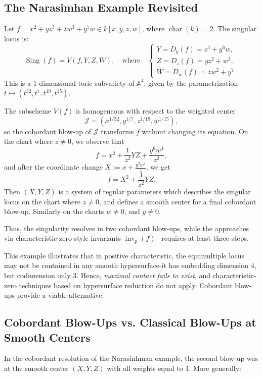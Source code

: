\documentclass{amsart}
\renewcommand{\AA}{{\mathbb{A}}}
\newcommand{\cJ}{{\mathcal J}}
\newcommand{\Sing}{{\operatorname{Sing}}}
\newcommand{\inv}{{\operatorname{inv}}}
\begin{document}
\subsection{The Narasimhan Example Revisited} 
\begin{example}[Narasimhan] \label{NS}
Let \( f = x^2 + y z^3 + z w^3 + y^7 w \in k[x,y,z,w] \), where \( \operatorname{char}(k) = 2 \). The singular locus is:
\[
\Sing(f) = V(f, Y, Z, W), \quad \text{where} \quad
\begin{cases}
Y = D_y(f) = z^3 + y^6 w, \\
Z = D_z(f) = y z^2 + w^3, \\
W = D_w(f) = z w^2 + y^7.
\end{cases}
\]
This is a 1-dimensional toric subvariety of \( \AA^4 \), given by the parametrization \( t \mapsto (t^{32}, t^7, t^{19}, t^{15}) \).

The subscheme \( V(f) \) is homogeneous with respect to the weighted center
\[
\cJ = (x^{1/32}, y^{1/7}, z^{1/19}, w^{1/15}),
\]
so the cobordant blow-up of \( \cJ \) transforms \( f \) without changing its equation. On the chart where \( z \neq 0 \), we observe that
\[
f = x^2 + \frac{1}{z^2} YZ + \frac{y^6 w^4}{z^2},
\]
and after the coordinate change \( X := x + \frac{y^3 w^2}{z} \), we get
\[
f = X^2 + \frac{1}{z^2} Y Z.
\]
Then \( (X, Y, Z) \) is a system of regular parameters which describes the singular locus on the chart where \( z \neq 0 \), and defines a smooth center for a final cobordant blow-up. Similarly on the charts  $w\neq 0$, and $y\neq 0$.

Thus, the singularity resolves in two cobordant blow-ups, while the approaches via characteristic-zero-style invariants $\inv_p(f)$ \ requires at least three steps.

\end{example}

\begin{remark}
This example illustrates that in positive characteristic, the equimultiple locus  may not be contained in any smooth hypersurface-it has embedding dimension 4, but codimension only 3. Hence, \emph{maximal contact fails to exist}, and characteristic-zero techniques based on hypersurface reduction do not apply. Cobordant blow-ups provide a viable alternative.
\end{remark}
\subsection{Cobordant Blow-Ups vs. Classical Blow-Ups at Smooth Centers}
In the cobordant resolution of the Narasinhman example, the second blow-up was at the smooth center \( (X, Y, Z) \) with all weights equal to 1. More generally:
\end{document}
